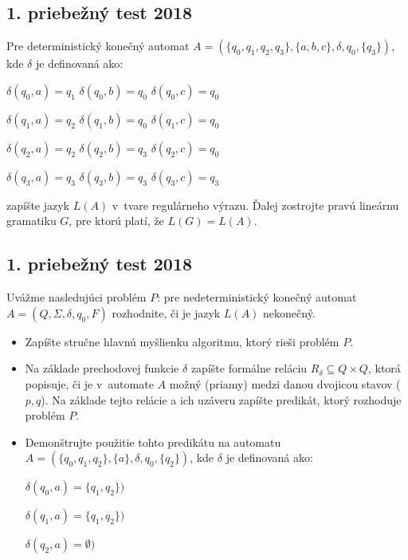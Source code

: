 \documentclass[11pt,a4paper]{article}
\begin{document}
		\subsection{1. priebežný test 2018}

		Pre deterministický konečný automat $A = (\{q_0,q_1,q_2,q_3\}, \{a,b,c\}, \delta, q_0, \{q_3\})$, kde $\delta$ je definovaná ako:

		$\delta(q_0, a) = q_1$ \hspace{10pt} $\delta(q_0, b) = q_0$ \hspace{10pt} $\delta(q_0, c) = q_0$

		$\delta(q_1, a) = q_2$ \hspace{10pt} $\delta(q_1, b) = q_0$ \hspace{10pt} $\delta(q_1, c) = q_0$

		$\delta(q_2, a) = q_2$ \hspace{10pt} $\delta(q_2, b) = q_3$ \hspace{10pt} $\delta(q_2, c) = q_0$

		$\delta(q_3, a) = q_3$ \hspace{10pt} $\delta(q_3, b) = q_3$ \hspace{10pt} $\delta(q_3, c) = q_3$

		zapíšte jazyk $L(A)$ v~tvare regulárneho výrazu. Ďalej zostrojte pravú lineárnu gramatiku $G$, pre ktorú platí, že $L(G) = L(A)$.

		\subsection{1. priebežný test 2018}

		Uvážme nasledujúci problém $P$: pre nedeterministický konečný automat $A = (Q, \Sigma, \delta, q_0, F)$ rozhodnite, či je jazyk $L(A)$ nekonečný.

		\begin{itemize}
			\item Zapíšte stručne hlavnú myšlienku algoritmu, ktorý rieši problém $P$.
			\item Na základe prechodovej funkcie $\delta$ zapíšte formálne reláciu $R_\delta \subseteq Q \times Q$, ktorá popisuje, či je v~automate $A$ možný (priamy) medzi danou dvojicou stavov ($p,q$). Na základe tejto relácie a ich uzáveru zapíšte predikát, ktorý rozhoduje problém $P$.
			\item Demonštrujte použitie tohto predikátu na automatu $A = (\{q_0,q_1,q_2\}, \{a\}, \delta, q_0, \{q_2\})$, kde $\delta$ je definovaná ako:

			$\delta(q_0, a) = \{q_1, q_2\})$

			$\delta(q_1, a) = \{q_1, q_2\})$

			$\delta(q_2, a) = \emptyset)$
		\end{itemize}
\end{document}
